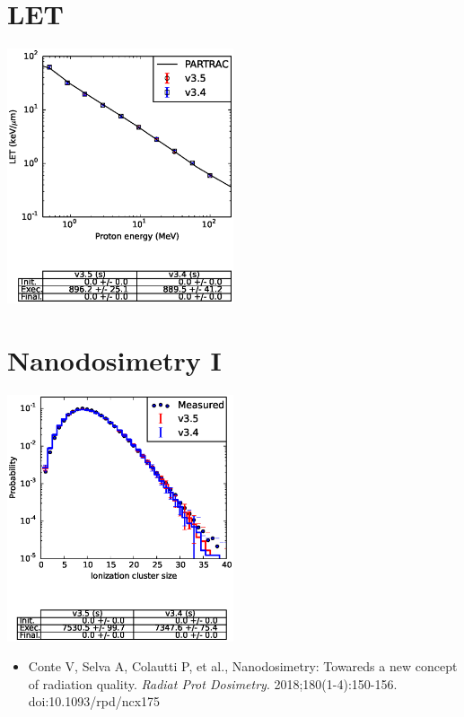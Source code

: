 \documentclass[aspectratio=1610]{beamer}
\begin{document}
\section{LET}

\begin{frame}{\secname}
 \centering
   \includegraphics[width=0.5\textwidth]{LET}
\end{frame}

\section{Nanodosimetry I}

\begin{frame}{\secname}
 \centering
   \includegraphics[width=0.5\textwidth]{NanodosimetryI}
\begin{itemize}
 \item \tiny{Conte V, Selva A, Colautti P, et al., Nanodosimetry: Towareds a new concept of radiation quality. \textit{Radiat Prot Dosimetry}. 2018;180(1-4):150-156. doi:10.1093/rpd/ncx175}
\end{itemize}
\end{frame}
\end{document}

